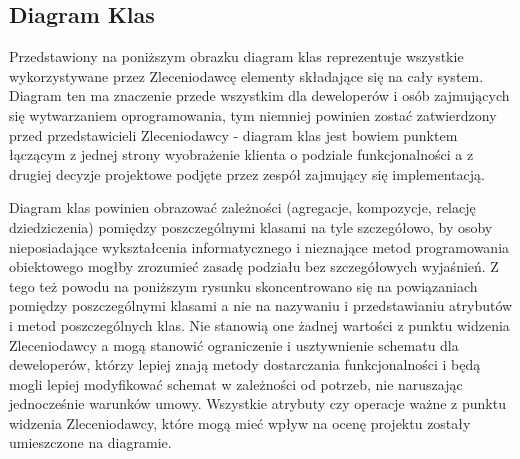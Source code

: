 \subsection{Diagram Klas}

Przedstawiony na poniższym obrazku diagram klas reprezentuje wszystkie
wykorzystywane przez Zleceniodawcę elementy składające się na cały system.
Diagram ten ma znaczenie przede wszystkim dla deweloperów i osób zajmujących się
wytwarzaniem oprogramowania, tym niemniej powinien zostać zatwierdzony przed
przedstawicieli Zleceniodawcy - diagram klas jest bowiem punktem łączącym z
jednej strony wyobrażenie klienta o podziale funkcjonalności a z drugiej decyzje
projektowe podjęte przez zespół zajmujący się implementacją.

Diagram klas powinien obrazować zależności (agregacje, kompozycje, relację
dziedziczenia) pomiędzy poszczególnymi klasami na tyle szczegółowo, by osoby 
nieposiadające wykształcenia informatycznego i nieznające metod programowania
obiektowego mogłby zrozumieć zasadę podziału bez szczegółowych wyjaśnień. Z tego
też powodu na poniższym rysunku skoncentrowano się na powiązaniach pomiędzy
poszczególnymi klasami a nie na nazywaniu i przedstawianiu atrybutów i metod
poszczególnych klas. Nie stanowią one żadnej wartości z punktu widzenia
Zleceniodawcy a mogą stanowić ograniczenie i usztywnienie schematu dla
deweloperów, którzy lepiej znają metody dostarczania funkcjonalności i będą
mogli lepiej modyfikować schemat w zależności od potrzeb, nie naruszając
jednocześnie warunków umowy. Wszystkie atrybuty czy operacje ważne z punktu
widzenia Zleceniodawcy, które mogą mieć wpływ na ocenę projektu zostały
umieszczone na diagramie.

